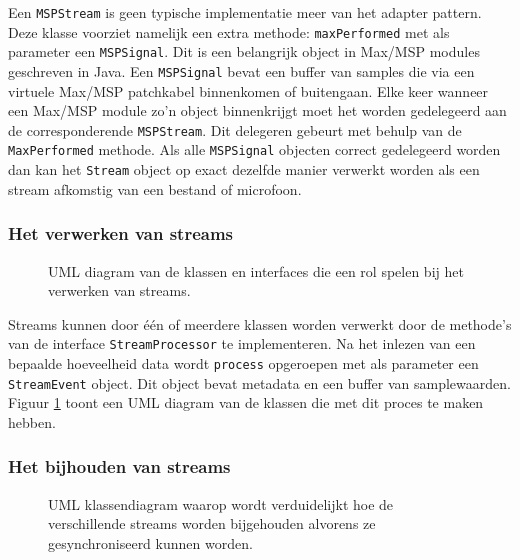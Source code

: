Een \texttt{MSPStream} is geen typische implementatie meer van het adapter pattern. Deze klasse voorziet namelijk een extra methode: \texttt{maxPerformed} met als parameter een \texttt{MSPSignal}. Dit is een belangrijk object in Max/MSP modules geschreven in Java. Een \texttt{MSPSignal} bevat een buffer van samples die via een virtuele Max/MSP patchkabel binnenkomen of buitengaan. Elke keer wanneer een Max/MSP module zo'n object binnenkrijgt moet het worden gedelegeerd aan de corresponderende \texttt{MSPStream}. Dit delegeren gebeurt met behulp van de \texttt{MaxPerformed} methode. Als alle \texttt{MSPSignal} objecten correct gedelegeerd worden dan kan het \texttt{Stream} object op exact dezelfde manier verwerkt worden als een stream afkomstig van een bestand of microfoon.

\subsubsection{Het verwerken van streams}
\label{streamprocessing}

\begin{figure}[h!]
	\captionsetup{width=0.7\textwidth}
	\caption[UML diagram van de stream verwerkingsklassen]{UML diagram van de klassen en interfaces die een rol spelen bij het verwerken van streams.}
	\begin{center}
		\advance\parskip0.3cm
		
	\end{center}
	\label{StreamProcessing}
\end{figure}

Streams kunnen door één of meerdere klassen worden verwerkt door de methode's van de interface \texttt{StreamProcessor} te implementeren. Na het inlezen van een bepaalde hoeveelheid data wordt \texttt{process} opgeroepen met als parameter een \texttt{StreamEvent} object. Dit object bevat metadata en een buffer van samplewaarden. Figuur \ref{StreamProcessing} toont een UML diagram van de klassen die met dit proces te maken hebben.

\subsubsection{Het bijhouden van streams}

\begin{figure}[h!]
	\captionsetup{width=0.7\textwidth}
	\caption[UML diagram dat toont hoe streams worden opgeslagen]{UML klassendiagram waarop wordt verduidelijkt hoe de verschillende streams worden bijgehouden alvorens ze gesynchroniseerd kunnen worden. }
	\begin{center}
		\advance\parskip0.3cm
		
	\end{center}
	\label{streamStorage}
\end{figure}

